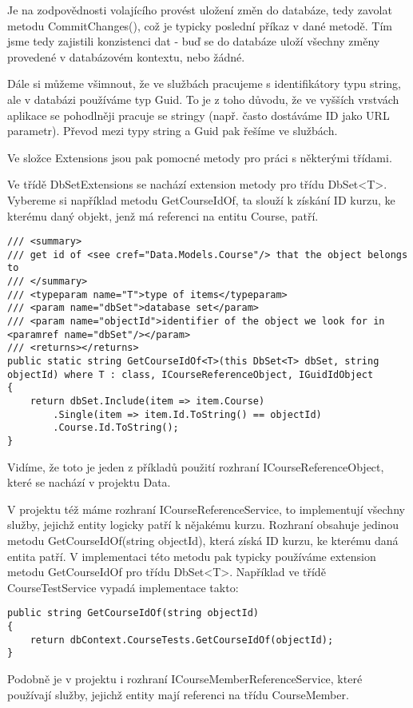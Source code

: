 Je na zodpovědnosti volajícího provést uložení změn do databáze, tedy zavolat metodu CommitChanges(), což je typicky poslední příkaz v dané metodě.
Tím jsme tedy zajistili konzistenci dat - buď se do databáze uloží všechny změny provedené v databázovém kontextu, nebo žádné.

Dále si můžeme všimnout, že ve službách pracujeme s identifikátory typu string, ale v databázi používáme typ Guid. To je z toho důvodu, že ve vyšších vrstvách aplikace se pohodlněji pracuje se stringy (např. často dostáváme ID jako URL parametr). Převod mezi typy string a Guid pak řešíme ve službách.

Ve složce Extensions jsou pak pomocné metody pro práci s některými třídami.

Ve třídě DbSetExtensions se nachází extension metody pro třídu DbSet<T>. Vybereme si například metodu GetCourseIdOf, ta slouží k získání ID kurzu, ke kterému daný objekt, jenž má referenci na entitu Course, patří.
\begin{lstlisting}
/// <summary>
/// get id of <see cref="Data.Models.Course"/> that the object belongs to
/// </summary>
/// <typeparam name="T">type of items</typeparam>
/// <param name="dbSet">database set</param>
/// <param name="objectId">identifier of the object we look for in <paramref name="dbSet"/></param>
/// <returns></returns>
public static string GetCourseIdOf<T>(this DbSet<T> dbSet, string objectId) where T : class, ICourseReferenceObject, IGuidIdObject
{
	return dbSet.Include(item => item.Course)
		.Single(item => item.Id.ToString() == objectId)
		.Course.Id.ToString();
}
\end{lstlisting}

Vidíme, že toto je jeden z příkladů použití rozhraní ICourseReferenceObject, které se nachází v projektu Data.

V projektu též máme rozhraní ICourseReferenceService, to implementují všechny služby, jejichž entity logicky patří k nějakému kurzu. Rozhraní obsahuje jedinou metodu GetCourseIdOf(string objectId), která získá ID kurzu, ke kterému daná entita patří. V implementaci této metodu pak typicky používáme extension metodu GetCourseIdOf pro třídu DbSet<T>. Například ve třídě CourseTestService vypadá implementace takto:

\begin{lstlisting}
public string GetCourseIdOf(string objectId)
{
	return dbContext.CourseTests.GetCourseIdOf(objectId);
}
\end{lstlisting}

Podobně je v projektu i rozhraní ICourseMemberReferenceService, které používají služby, jejichž entity mají referenci na třídu CourseMember.

